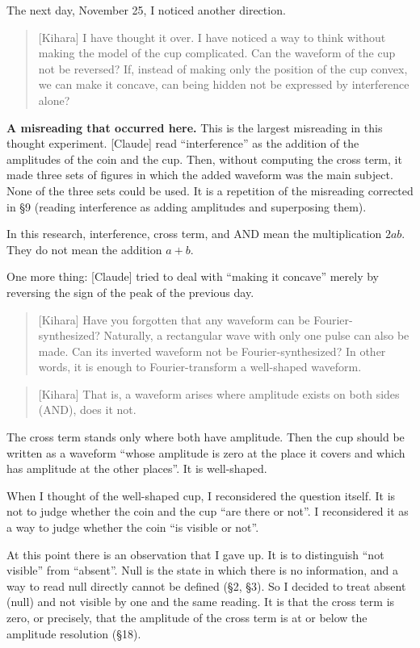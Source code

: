 \documentclass[
  a4paper,
]{article}
\begin{document}
The next day, November 25, I noticed another direction.

\begin{quote}
{[}Kihara{]} I have thought it over. I have noticed a way to think
without making the model of the cup complicated. Can the waveform of the
cup not be reversed? If, instead of making only the position of the cup
convex, we can make it concave, can being hidden not be expressed by
interference alone?
\end{quote}

\textbf{A misreading that occurred here.} This is the largest misreading
in this thought experiment. {[}Claude{]} read ``interference'' as the
addition of the amplitudes of the coin and the cup. Then, without
computing the cross term, it made three sets of figures in which the
added waveform was the main subject. None of the three sets could be
used. It is a repetition of the misreading corrected in §9 (reading
interference as adding amplitudes and superposing them).

In this research, interference, cross term, and AND mean the
multiplication \(2ab\). They do not mean the addition \(a+b\).

One more thing: {[}Claude{]} tried to deal with ``making it concave''
merely by reversing the sign of the peak of the previous day.

\begin{quote}
{[}Kihara{]} Have you forgotten that any waveform can be
Fourier-synthesized? Naturally, a rectangular wave with only one pulse
can also be made. Can its inverted waveform not be Fourier-synthesized?
In other words, it is enough to Fourier-transform a well-shaped
waveform.
\end{quote}

\begin{quote}
{[}Kihara{]} That is, a waveform arises where amplitude exists on both
sides (AND), does it not.
\end{quote}

The cross term stands only where both have amplitude. Then the cup
should be written as a waveform ``whose amplitude is zero at the place
it covers and which has amplitude at the other places''. It is
well-shaped.

When I thought of the well-shaped cup, I reconsidered the question
itself. It is not to judge whether the coin and the cup ``are there or
not''. I reconsidered it as a way to judge whether the coin ``is visible
or not''.

At this point there is an observation that I gave up. It is to
distinguish ``not visible'' from ``absent''. Null is the state in which
there is no information, and a way to read null directly cannot be
defined (§2, §3). So I decided to treat absent (null) and not visible by
one and the same reading. It is that the cross term is zero, or
precisely, that the amplitude of the cross term is at or below the
amplitude resolution (§18).
\end{document}

